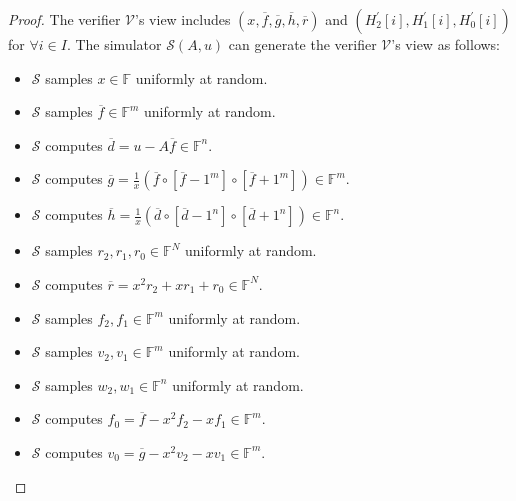 \begin{proof}

The  verifier $\mathcal{V}$'s view includes $(x, \overline{f}, \overline{g}, \overline{h}, \overline{r})$ and $(H_2^\prime[i], H_1^\prime[i], H_0^\prime[i])$ for $\forall i \in I$. The simulator $\mathcal{S}(A, u)$ can generate the verifier $\mathcal{V}$'s view as follows:

\begin{itemize}

    \item $\mathcal{S}$ samples $x \in \mathbb{F}$ uniformly at random.

    \item $\mathcal{S}$ samples $\overline{f} \in \mathbb{F}^m$ uniformly at random.
    
    \item $\mathcal{S}$ computes $\overline{d} = u - A\overline{f} \in \mathbb{F}^n$.
    
    \item $\mathcal{S}$ computes $\overline{g} = \frac{1}{x} (\overline{f} \circ [\overline{f} - 1^m] \circ [\overline{f} + 1^m]) \in \mathbb{F}^m$.
    
    \item $\mathcal{S}$ computes $\overline{h} = \frac{1}{x} (\overline{d} \circ [\overline{d} - 1^n] \circ [\overline{d} + 1^n]) \in \mathbb{F}^n$.
    
    \item $\mathcal{S}$ samples $r_2, r_1, r_0 \in \mathbb{F}^N$ uniformly at random.
    
    \item $\mathcal{S}$ computes $\overline{r} = x^2 r_2 + x r_1 + r_0 \in \mathbb{F}^N$.

    \item $\mathcal{S}$ samples $f_2, f_1 \in \mathbb{F}^m$ uniformly at random.

    \item $\mathcal{S}$ samples $v_2, v_1 \in \mathbb{F}^m$ uniformly at random.
    
    \item $\mathcal{S}$ samples $w_2, w_1 \in \mathbb{F}^n$ uniformly at random.
    
    \item $\mathcal{S}$ computes $f_0 = \overline{f} - x^2 f_2 - x f_1 \in \mathbb{F}^m$.
    
    \item $\mathcal{S}$ computes $v_0 = \overline{g} - x^2 v_2 - x v_1 \in \mathbb{F}^m$.


\end{itemize}
\end{proof}
